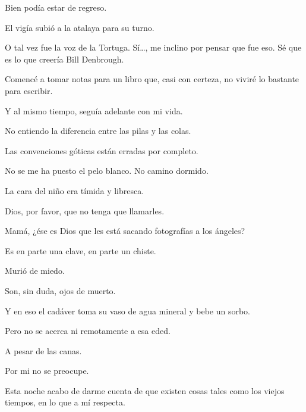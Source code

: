 \sk
Bien podía estar de regreso. 

\sk
El vigía subió a la atalaya para su turno. 

\sk
O tal vez fue la voz de la Tortuga. Sí\ldots{}, me
inclino por pensar que fue eso. Sé que es lo que
creería Bill Denbrough.

\sk
Comencé a tomar notas
para un libro que, casi con certeza, no viviré lo
bastante para escribir.\nb{}

\sk
Y al mismo tiempo, seguía
adelante con mi vida. 

\sk
No entiendo la diferencia entre las pilas y las colas. 

\sk
Las convenciones góticas están erradas por
completo. 

\sk
No se me ha puesto el pelo blanco. No
camino dormido. 

\sk
La cara del niño era tímida y libresca. 

\sk
Dios, por favor, que no tenga que llamarles.

\sk
Mamá, ¿ése es Dios que les
está sacando fotografías a los ángeles? 

\sk
Es en parte una clave, en parte un chiste. 

\sk
Murió de miedo. \nb{}

\sk
Son, sin duda, ojos de muerto. 

\sk
Y en eso el cadáver toma
su vaso de agua mineral y bebe un sorbo.

\sk
Pero no se acerca ni remotamente a esa eded. 

\sk
A pesar de las canas. 

\sk
Por mi no se preocupe. 

\sk
Esta noche acabo de darme cuenta de
que existen cosas tales como los viejos tiempos,
en lo que a mí respecta.

